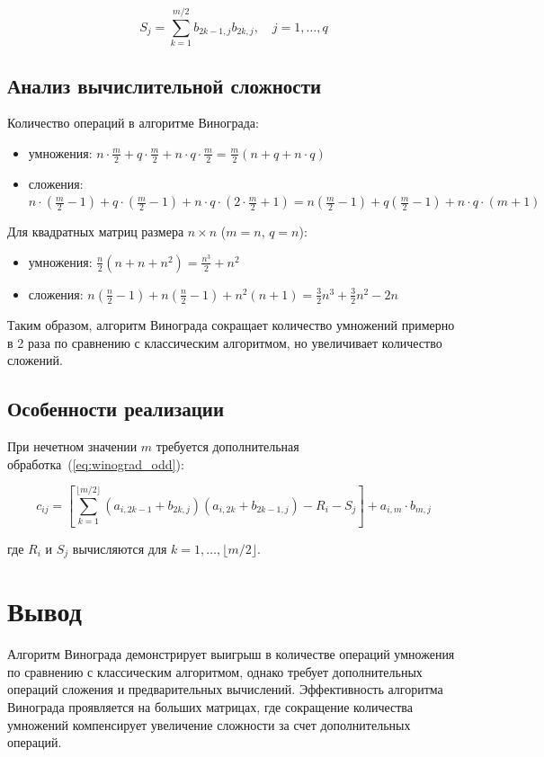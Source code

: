 \begin{equation}
	S_j = \sum_{k=1}^{m/2} b_{2k-1,j}b_{2k,j}, \quad j = 1,\ldots,q
	\label{eq:col_factor}
\end{equation}

\subsection{Анализ вычислительной сложности}

Количество операций в алгоритме Винограда:
\begin{itemize}
	\item умножения: $n \cdot \frac{m}{2} + q \cdot \frac{m}{2} + n \cdot q \cdot \frac{m}{2} = \frac{m}{2}(n + q + n \cdot q)$
	\item сложения: $n \cdot (\frac{m}{2}-1) + q \cdot (\frac{m}{2}-1) + n \cdot q \cdot (2 \cdot \frac{m}{2} + 1) = n(\frac{m}{2}-1) + q(\frac{m}{2}-1) + n \cdot q \cdot (m + 1)$
\end{itemize}

Для квадратных матриц размера $n \times n$ ($m = n$, $q = n$):
\begin{itemize}
	\item умножения: $\frac{n}{2}(n + n + n^2) = \frac{n^3}{2} + n^2$
	\item сложения: $n(\frac{n}{2}-1) + n(\frac{n}{2}-1) + n^2(n + 1) = \frac{3}{2}n^3 + \frac{3}{2}n^2 - 2n$
\end{itemize}

Таким образом, алгоритм Винограда сокращает количество умножений примерно в 2 раза по сравнению с классическим алгоритмом, но увеличивает количество сложений.

\subsection{Особенности реализации}



При нечетном значении $m$ требуется дополнительная обработка~(\ref{eq:winograd_odd}):

\begin{equation}
	c_{ij} = \left[\sum_{k=1}^{\lfloor m/2 \rfloor} (a_{i,2k-1} + b_{2k,j})(a_{i,2k} + b_{2k-1,j}) - R_i - S_j\right] + a_{i,m} \cdot b_{m,j}
	\label{eq:winograd_odd}
\end{equation}

где $R_i$ и $S_j$ вычисляются для $k = 1,\ldots,\lfloor m/2 \rfloor$.
\section*{Вывод}

Алгоритм Винограда демонстрирует выигрыш в количестве операций умножения по сравнению с классическим алгоритмом, однако требует дополнительных операций сложения и предварительных вычислений. Эффективность алгоритма Винограда проявляется на больших матрицах, где сокращение количества умножений компенсирует увеличение сложности за счет дополнительных операций.

\clearpage
